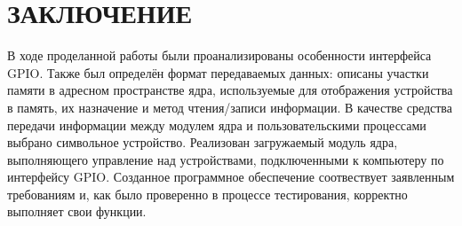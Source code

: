 \section*{ЗАКЛЮЧЕНИЕ}

В ходе проделанной работы были проанализированы особенности интерфейса GPIO. Также был определён формат передаваемых данных: описаны участки памяти в адресном пространстве ядра, используемые для отображения устройства в память, их назначение и метод чтения/записи информации. В качестве средства передачи информации между модулем ядра и пользовательскими процессами выбрано символьное устройство. Реализован загружаемый модуль ядра, выполняющего управление над устройствами, подключенными к компьютеру по интерфейсу GPIO. Созданное программное обеспечение соотвествует заявленным требованиям и, как было проверенно в процессе тестирования, корректно выполняет свои функции.

\pagebreak